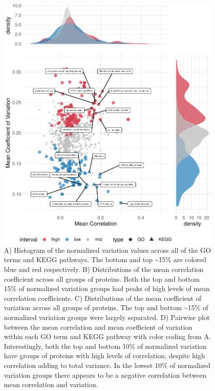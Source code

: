 \documentclass[11pt,]{article}
\begin{document}
\begin{figure}
\centering
\includegraphics{output/figures/figure_2-1.pdf}
\caption{A) Histogram of the normalized variation values across all of
the GO terms and KEGG pathways. The bottom and top \textasciitilde{}15\%
are colored blue and red respectively. B) Distributions of the mean
correlation coefficient across all groups of proteins. Both the top and
bottom 15\% of normalized variation groups had peaks of high levels of
mean correlation coefficients. C) Distributions of the mean coefficient
of variation across all groups of proteins. The top and bottom
\textasciitilde{}15\% of normalized variation groups were largely
separated. D) Pairwise plot between the mean correlation and mean
coefficient of variation within each GO term and KEGG pathway with color
coding from A. Interestingly, both the top and bottom 10\% of normalized
variation have groups of proteins with high levels of correlation,
despite high correlation adding to total variance. In the lowest 10\% of
normalized variation groups there appears to be a negative correlation
between mean correlation and variation.}
\end{figure}
\end{document}
